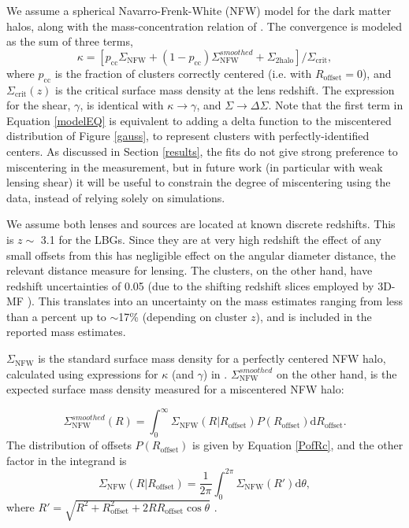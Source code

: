 We assume a spherical Navarro-Frenk-White (NFW) model \citep{nfw97} for the dark matter halos, along with the mass-concentration relation of \citet{Prada12}. The convergence is modeled as the sum of three terms,
\begin{equation}
\kappa = \left[p_{\mathrm{cc}}\Sigma_{\mathrm{NFW}} +(1-p_{\mathrm{cc}})\Sigma_{\mathrm{NFW}}^{smoothed} + \Sigma_{\mathrm{2halo}} \right]/\Sigma_{\mathrm{crit}},
\label{modelEQ}
\end{equation}
where $p_{\mathrm{cc}}$ is the fraction of clusters correctly centered (i.e. with $R_{\mathrm{offset}}=0$), and $\Sigma_{\mathrm{crit}}(z)$ is the critical surface mass density at the lens redshift. The expression for the shear, $\gamma$, is identical with $\kappa \rightarrow \gamma$, and $\Sigma \rightarrow \Delta\Sigma$. Note that the first term in Equation \ref{modelEQ} is equivalent to adding a delta function to the miscentered distribution of Figure \ref{gauss}, to represent clusters with perfectly-identified centers. As discussed in Section \ref{results}, the fits do not give strong preference to miscentering in the measurement, but in future work (in particular with weak lensing shear) it will be useful to constrain the degree of miscentering using the data, instead of relying solely on simulations.

We assume both lenses and sources are located at known discrete redshifts. This is $z \sim$ 3.1 for the LBGs. Since they are at very high redshift the effect of any small offsets from this has negligible effect on the angular diameter distance, the relevant distance measure for lensing. The clusters, on the other hand, have redshift uncertainties of 0.05 (due to the shifting redshift slices employed by 3D-MF \citep{Milkeraitis10}). This translates into an uncertainty on the mass estimates ranging from less than a percent up to $\sim$17\% (depending on cluster $z$), and is included in the reported mass estimates.

$\Sigma_{\mathrm{NFW}}$ is the standard surface mass density for a perfectly centered NFW halo, calculated using expressions for $\kappa$ (and $\gamma$) in \citet{Wright00}. $\Sigma_{\mathrm{NFW}}^{smoothed}$ on the other hand, is the expected surface mass density measured for a miscentered NFW halo:

\begin{equation}
\Sigma_{\mathrm{NFW}}^{smoothed}(R)  = \int_0^\infty \Sigma_{\mathrm{NFW}}(R \vert R_{\mathrm{offset}}) P(R_{\mathrm{offset}}) \mathrm{d}R_{\mathrm{offset}}.
\end{equation}
The distribution of offsets $P(R_{\mathrm{offset}})$ is given by Equation \ref{PofRc}, and the other factor in the integrand is
\begin{equation}
\Sigma_{\mathrm{NFW}}(R \vert R_{\mathrm{offset}}) = \frac{1}{2\pi} \int_0^{2\pi} \Sigma_{\mathrm{NFW}}(R') \mathrm{d}\theta,
\end{equation}
where $R' = \sqrt{R^2 + R_{\mathrm{offset}}^2 + 2RR_{\mathrm{offset}}\cos\theta}$ \citep{Yang06}.


